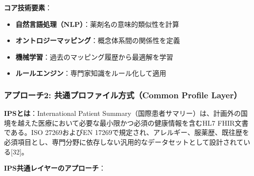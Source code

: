 \documentclass[
  a4paper,
  a4paper,
  11pt]{ltjsbook}
\providecommand{\tightlist}{%
  \setlength{\itemsep}{0pt}\setlength{\parskip}{0pt}}
\begin{document}
\textbf{コア技術要素}：

\begin{itemize}
\tightlist
\item
  \textbf{自然言語処理（NLP）}：薬剤名の意味的類似性を計算
\item
  \textbf{オントロジーマッピング}：概念体系間の関係性を定義
\item
  \textbf{機械学習}：過去のマッピング履歴から最適解を学習
\item
  \textbf{ルールエンジン}：専門家知識をルール化して適用
\end{itemize}

\subsubsection{アプローチ2: 共通プロファイル方式（Common Profile
Layer）}\label{ux30a2ux30d7ux30edux30fcux30c12-ux5171ux901aux30d7ux30edux30d5ux30a1ux30a4ux30ebux65b9ux5f0fcommon-profile-layer}

\begin{tcolorbox}[enhanced jigsaw, toprule=.15mm, bottomtitle=1mm, coltitle=black, left=2mm, opacityback=0, arc=.35mm, colbacktitle=quarto-callout-note-color!10!white, colback=white, opacitybacktitle=0.6, bottomrule=.15mm, rightrule=.15mm, breakable, title=\textcolor{quarto-callout-note-color}{\faInfo}\hspace{0.5em}{Note}, toptitle=1mm, titlerule=0mm, colframe=quarto-callout-note-color-frame, leftrule=.75mm]

\textbf{IPSとは}：International Patient
Summary（国際患者サマリー）は、計画外の国境を越えた医療において必要な最小限かつ必須の健康情報を含むHL7
FHIR文書である。ISO 27269およびEN
17269で規定され、アレルギー、服薬歴、既往歴を必須項目とし、専門分野に依存しない汎用的なデータセットとして設計されている{[}32{]}。

\end{tcolorbox}

\textbf{IPS共通レイヤーのアプローチ}：
\end{document}
